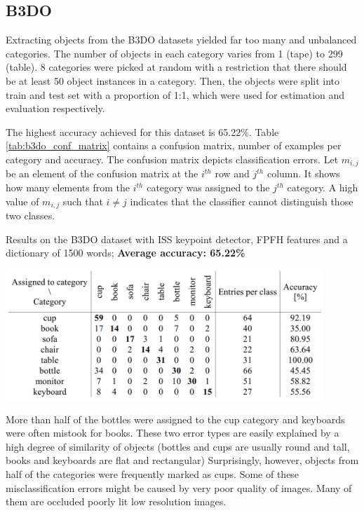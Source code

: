 \documentclass[12pt]{article}
\begin{document}
  \subsection{B3DO}
    Extracting objects from the B3DO datasets yielded far too many and 
unbalanced categories. The number of objects in each category varies from 1 
(tape) to 299 (table). 8 categories were picked at random with a restriction 
that there should be at least 50 object instances in a category. Then, the 
objects were split into train and test set with a proportion of 1:1, which were 
used for estimation and evaluation respectively.

    The highest accuracy achieved for this dataset is 65.22\%. Table 
\ref{tab:b3do_conf_matrix} contains a confusion matrix, number of examples per 
category and accuracy. The confusion matrix depicts classification errors. Let 
$m_{i, j}$ be an element of the confusion matrix at the $i^{th}$ row and 
$j^{th}$ column. It shows how many elements from the $i^{th}$ category was 
assigned to the $j^{th}$ category. A high value of $m_{i, j}$ such that $i \neq 
j$ indicates that the classifier cannot distinguish those two classes.

    \begin{table}[!ht]
    \centering
    \caption{Results on the B3DO dataset with ISS keypoint detector, FPFH 
features and a dictionary of 1500 words; \textbf{Average accuracy: 65.22\%}}
    \includegraphics[width=0.9\textwidth]{../figs/b3do_conf_matrix}	
    \label{tab:b3do_conf_matrix}
    \end{table}   

    More than half of the bottles were assigned to the cup category and 
keyboards were often mistook for books. These two error types are easily 
explained by a high degree of similarity of objects (bottles and cups are 
usually round and tall, books and keyboards are flat and rectangular) 
Surprisingly, however, objects from half of the categories were frequently 
marked as cups. Some of these misclassification errors might be caused by very 
poor quality of images. Many of them are occluded poorly lit low resolution 
images.	
\end{document}
